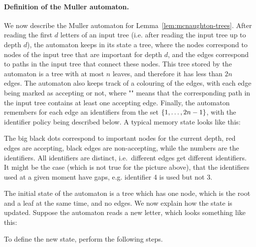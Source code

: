 




\paragraph*{Definition of the Muller automaton.} We now describe the Muller automaton for Lemma~\ref{lem:mcnaughton-trees}. After reading the first $d$ letters of an input tree (i.e. after reading the input tree up to depth $d$), the automaton keeps in its state a tree, where the nodes correspond to nodes of the input tree that are important for depth $d$, and the edges correspond to paths in the input tree that connect these nodes. This tree stored by the automaton is a tree with at most $n$ leaves, and therefore it has less than $2n$ edges. The automaton also keeps track of a colouring of the edges, with each edge being marked as accepting or not, where "" means that the corresponding path in the input tree contains at least one accepting edge. Finally, the automaton remembers for each edge an identifiers from the set $\{1,\ldots,2n-1\}$, with the identifier policy being described below. A typical memory state looks like this:


The big black dots correspond to important nodes for the current depth, red edges are accepting, black edges are non-accepting, while the numbers are the identifiers. All identifiers are distinct, i.e.~different edges get different identifiers. It might be the case (which is not true for the picture above), that the identifiers used at a given moment have gaps, e.g. identifier 4 is used but not 3.

The initial state of the automaton is a tree which has one node, which is the root and a leaf at the same time, and no edges. We now explain how the state is updated. Suppose the automaton reads a new letter, which looks something like this:


To define the new state, perform the following  steps.

